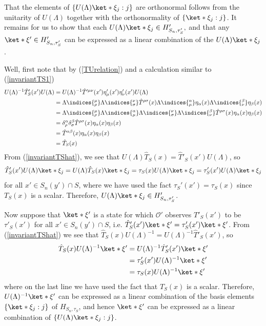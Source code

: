 \documentclass[12pt]{report}
\begin{document}
That the elements of $\{U(\Lambda)\ket*{\xi_j}:j\}$ are orthonormal follows from the unitarity of $U(\Lambda)$ together with the orthonormality of  $\{\ket*{\xi_j}:j\}$. 
It remains for us to show that each $U(\Lambda)\ket*{\xi_j}\in H'_{S_n,\tau_S'},$ and that any $\ket*{\xi'}\in H'_{S_n,\tau_S'}$ can be expressed as a linear combination of the $U(\Lambda)\ket*{\xi_j}$.

Well, first note that by (\ref{TUrelation}) and a calculation similar to (\ref{invariantTS1})
\begin{equation}
\begin{split}\label{invariantTShat}
U(\Lambda)^{-1}\hat{T}'_S(x')U(\Lambda)&=U(\Lambda)^{-1}\hat{T}^{\prime\mu\nu}(x')\eta'_{\mu}(x')\eta'_{\nu}(x')U(\Lambda)\\
&=\Lambda\indices{^\mu_\rho}\Lambda\indices{^\nu_\sigma}\hat{T}^{\rho\sigma}(x)\Lambda\indices{_\mu^\alpha}\eta_{\alpha}(x)\Lambda\indices{_\nu^\beta}\eta_{\beta}(x)\\
&=\Lambda\indices{^\mu_\rho}\Lambda\indices{_\mu^\alpha} \Lambda\indices{^\nu_\sigma}\Lambda\indices{_\nu^\beta}\hat{T}^{\rho\sigma}(x)\eta_{\alpha}(x)\eta_{\beta}(x)\\
&=\delta^\alpha_\rho\delta^\beta_\sigma \hat{T}^{\rho\sigma}(x)\eta_{\alpha}(x)\eta_{\beta}(x)\\
&=\hat{T}^{\alpha\beta}(x)\eta_{\alpha}(x)\eta_{\beta}(x)\\
&=\hat{T}_S(x)
\end{split}
\end{equation}
From (\ref{invariantTShat}), we see that  $U(\Lambda)\hat{T}_S(x)=\hat{T}'_S(x')U(\Lambda)$, so
$$
\hat{T}_S'(x')U(\Lambda)\ket*{\xi_j}=U(\Lambda)\hat{T}_S(x)\ket*{\xi_j}=\tau_S(x)U(\Lambda)\ket*{\xi_j}=\tau_S'(x')U(\Lambda)\ket*{\xi_j}
$$
for all $x'\in S_n(y')\cap S$, where we have used the fact $\tau_S'(x')=\tau_S(x)$ since $T_S(x)$ is a scalar. Therefore, $U(\Lambda)\ket*{\xi_j}\in H'_{S_n,\tau_S'}$. 

Now suppose that $\ket*{\xi'}$ is a state for which $\mathcal{O}'$ observes $T'_S(x')$ to be $\tau'_S(x')$ for all $x'\in S_n(y')\cap S$, i.e.  $\hat{T}_S'(x')\ket*{\xi'}=\tau_S'(x')\ket*{\xi'}$. From (\ref{invariantTShat}) we see that  $\hat{T}_S(x)U(\Lambda)^{-1}=U(\Lambda)^{-1}\hat{T}'_S(x')$, so
\begin{equation}\label{TSUxi}
\begin{split}
\hat{T}_S(x)U(\Lambda)^{-1}\ket*{\xi'}&= U(\Lambda)^{-1} \hat{T}_S'(x')\ket*{\xi'}\\
&=\tau_S'(x')U(\Lambda)^{-1}\ket*{\xi'}\\
&=\tau_S(x)U(\Lambda)^{-1}\ket*{\xi'}
\end{split}
\end{equation}
where on the last line we have used the fact that $T_S(x)$ is a scalar. Therefore, $U(\Lambda)^{-1}\ket*{\xi'}$ can be expressed as a linear combination of the basis elements $\{\ket*{\xi_j}:j\}$ of $H_{S_n,\tau_S}$, and hence  $\ket*{\xi'}$  can be expressed as a linear combination of $\{U(\Lambda)\ket*{\xi_j}:j\}$. 
\end{document}
